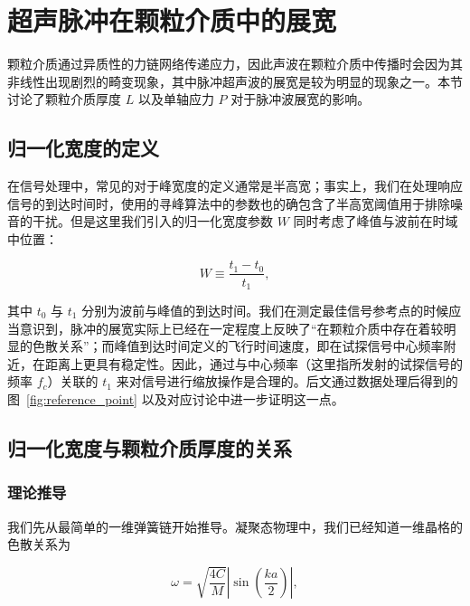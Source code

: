 
\section{超声脉冲在颗粒介质中的展宽}

颗粒介质通过异质性的力链网络传递应力，因此声波在颗粒介质中传播时会因为其非线性出现剧烈的畸变现象，其中脉冲超声波的展宽是较为明显的现象之一。本节讨论了颗粒介质厚度 $L$ 以及单轴应力 $P$ 对于脉冲波展宽的影响。

\subsection{归一化宽度的定义}

在信号处理中，常见的对于峰宽度的定义通常是半高宽；事实上，我们在处理响应信号的到达时间时，使用的寻峰算法中的参数也的确包含了半高宽阈值用于排除噪音的干扰。但是这里我们引入的归一化宽度参数 $W$ 同时考虑了峰值与波前在时域中位置：

\begin{equation}
  W \equiv \frac{t_{1}-t_{0}}{t_{1}},
\end{equation}

其中 $t_{0}$ 与 $t_{1}$ 分别为波前与峰值的到达时间。我们在测定最佳信号参考点的时候应当意识到，脉冲的展宽实际上已经在一定程度上反映了“在颗粒介质中存在着较明显的色散关系”；而峰值到达时间定义的飞行时间速度，即在试探信号中心频率附近，在距离上更具有稳定性。因此，通过与中心频率（这里指所发射的试探信号的频率 $f_{c}$）关联的 $t_{1}$ 来对信号进行缩放操作是合理的。后文通过数据处理后得到的图~\ref{fig:reference_point} 以及对应讨论中进一步证明这一点。

\subsection{归一化宽度与颗粒介质厚度的关系}

\subsubsection{理论推导}

我们先从最简单的一维弹簧链开始推导。凝聚态物理中，我们已经知道一维晶格的色散关系为

\begin{equation}
  \omega=\sqrt{\frac{4C}{M}}\left|\sin\left(\frac{ka}{2}\right)\right|,
\end{equation}

